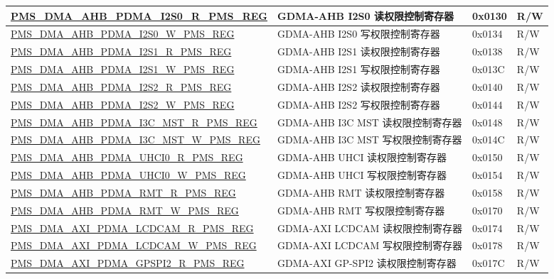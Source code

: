 \begin{longtable}{ | L{7.5cm} | L{6cm} | L{1.3cm} | L{1cm} | }
\hyperref[regdesc:PMSDMAAHBPDMAI2S0RPMSREG]{PMS\_DMA\_AHB\_PDMA\_I2S0\_R\_PMS\_REG} & GDMA-AHB I2S0 读权限控制寄存器 & 0x0130 & R/W \\ \hline
\hyperref[regdesc:PMSDMAAHBPDMAI2S0WPMSREG]{PMS\_DMA\_AHB\_PDMA\_I2S0\_W\_PMS\_REG} & GDMA-AHB I2S0 写权限控制寄存器 & 0x0134 & R/W \\ \hline
\hyperref[regdesc:PMSDMAAHBPDMAI2S1RPMSREG]{PMS\_DMA\_AHB\_PDMA\_I2S1\_R\_PMS\_REG} & GDMA-AHB I2S1 读权限控制寄存器 & 0x0138 & R/W \\ \hline
\hyperref[regdesc:PMSDMAAHBPDMAI2S1WPMSREG]{PMS\_DMA\_AHB\_PDMA\_I2S1\_W\_PMS\_REG} & GDMA-AHB I2S1 写权限控制寄存器 & 0x013C & R/W \\ \hline
\hyperref[regdesc:PMSDMAAHBPDMAI2S2RPMSREG]{PMS\_DMA\_AHB\_PDMA\_I2S2\_R\_PMS\_REG} & GDMA-AHB I2S2 读权限控制寄存器 & 0x0140 & R/W \\ \hline
\hyperref[regdesc:PMSDMAAHBPDMAI2S2WPMSREG]{PMS\_DMA\_AHB\_PDMA\_I2S2\_W\_PMS\_REG} & GDMA-AHB I2S2 写权限控制寄存器 & 0x0144 & R/W \\ \hline
\hyperref[regdesc:PMSDMAAHBPDMAI3CMSTRPMSREG]{PMS\_DMA\_AHB\_PDMA\_I3C\_MST\_R\_PMS\_REG} & GDMA-AHB I3C MST 读权限控制寄存器 & 0x0148 & R/W \\ \hline
\hyperref[regdesc:PMSDMAAHBPDMAI3CMSTWPMSREG]{PMS\_DMA\_AHB\_PDMA\_I3C\_MST\_W\_PMS\_REG} & GDMA-AHB I3C MST 写权限控制寄存器 & 0x014C & R/W \\ \hline
\hyperref[regdesc:PMSDMAAHBPDMAUHCI0RPMSREG]{PMS\_DMA\_AHB\_PDMA\_UHCI0\_R\_PMS\_REG} & GDMA-AHB UHCI 读权限控制寄存器 & 0x0150 & R/W \\ \hline
\hyperref[regdesc:PMSDMAAHBPDMAUHCI0WPMSREG]{PMS\_DMA\_AHB\_PDMA\_UHCI0\_W\_PMS\_REG} & GDMA-AHB UHCI 写权限控制寄存器 & 0x0154 & R/W \\ \hline
\hyperref[regdesc:PMSDMAAHBPDMARMTRPMSREG]{PMS\_DMA\_AHB\_PDMA\_RMT\_R\_PMS\_REG} & GDMA-AHB RMT 读权限控制寄存器 & 0x0158 & R/W \\ \hline
\hyperref[regdesc:PMSDMAAHBPDMARMTWPMSREG]{PMS\_DMA\_AHB\_PDMA\_RMT\_W\_PMS\_REG} & GDMA-AHB RMT 写权限控制寄存器 & 0x0170 & R/W \\ \hline
\hyperref[regdesc:PMSDMAAXIPDMALCDCAMRPMSREG]{PMS\_DMA\_AXI\_PDMA\_LCDCAM\_R\_PMS\_REG} & GDMA-AXI LCDCAM 读权限控制寄存器 & 0x0174 & R/W \\ \hline
\hyperref[regdesc:PMSDMAAXIPDMALCDCAMWPMSREG]{PMS\_DMA\_AXI\_PDMA\_LCDCAM\_W\_PMS\_REG} & GDMA-AXI LCDCAM 写权限控制寄存器 & 0x0178 & R/W \\ \hline
\hyperref[regdesc:PMSDMAAXIPDMAGPSPI2RPMSREG]{PMS\_DMA\_AXI\_PDMA\_GPSPI2\_R\_PMS\_REG} & GDMA-AXI GP-SPI2 读权限控制寄存器 & 0x017C & R/W \\ \hline

\end{longtable}
